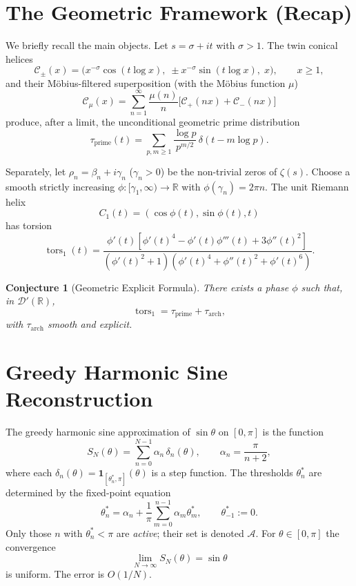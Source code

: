 \documentclass[12pt,a4paper]{article}
\newtheorem{conjecture}[theorem]{Conjecture}
\newcommand{\R}{\mathbb{R}}
\newcommand{\dist}{\mathcal{D}'}
\newcommand{\tors}{\operatorname{tors}}
\begin{document}
\section{The Geometric Framework (Recap)}

We briefly recall the main objects.  Let \(s=\sigma+it\) with \(\sigma>1\).  The twin conical helices
\[
\mathcal{C}_\pm(x) = \bigl( x^{-\sigma}\cos(t\log x),\; \pm x^{-\sigma}\sin(t\log x),\; x \bigr),\qquad x\ge1,
\]
and their M\"obius-filtered superposition (with the M\"obius function \(\mu\))
\[
\mathcal{C}_\mu(x)=\sum_{n=1}^\infty\frac{\mu(n)}{n}\bigl[ \mathcal{C}_+(nx)+\mathcal{C}_-(nx) \bigr]
\]
produce, after a limit, the unconditional geometric prime distribution
\[
\tau_{\mathrm{prime}}(t)=\sum_{p,m\ge1}\frac{\log p}{p^{m/2}}\,\delta(t-m\log p). \tag{1}
\]

Separately, let \(\rho_n=\beta_n+i\gamma_n\) (\(\gamma_n>0\)) be the non-trivial zeros of \(\zeta(s)\).  Choose a smooth strictly increasing \(\phi:[\gamma_1,\infty)\to\R\) with \(\phi(\gamma_n)=2\pi n\).  The unit Riemann helix
\[
C_1(t)=(\cos\phi(t),\sin\phi(t),t)
\]
has torsion
\[
\tors_1(t)=\frac{\phi'(t)[\phi'(t)^4-\phi'(t)\phi'''(t)+3\phi''(t)^2]}{(\phi'(t)^2+1)(\phi'(t)^4+\phi''(t)^2+\phi'(t)^6)}. \tag{2}
\]

\begin{conjecture}[Geometric Explicit Formula]\label{conj:GEF}
There exists a phase \(\phi\) such that, in \(\dist(\R)\),
\[
\tors_1 = \tau_{\mathrm{prime}} + \tau_{\mathrm{arch}},
\]
with \(\tau_{\mathrm{arch}}\) smooth and explicit.
\end{conjecture}

\section{Greedy Harmonic Sine Reconstruction}

The greedy harmonic sine approximation of \(\sin\theta\) on \([0,\pi]\) is the function
\[
S_N(\theta)=\sum_{n=0}^{N-1}\alpha_n\,\delta_n(\theta),\qquad
\alpha_n=\frac{\pi}{n+2},
\]
where each \(\delta_n(\theta)=\mathbf{1}_{[\theta_n^*,\pi]}(\theta)\) is a step function.  The thresholds \(\theta_n^*\) are determined by the fixed-point equation
\[
\theta_n^* = \alpha_n + \frac{1}{\pi}\sum_{m=0}^{n-1}\alpha_m\theta_m^*, \qquad \theta_{-1}^*:=0. \tag{3}
\]
Only those \(n\) with \(\theta_n^*<\pi\) are \emph{active}; their set is denoted \(\mathcal{A}\).  For \(\theta\in[0,\pi]\) the convergence
\[
\lim_{N\to\infty}S_N(\theta)=\sin\theta
\]
is uniform.  The error is \(O(1/N)\).
\end{document}
